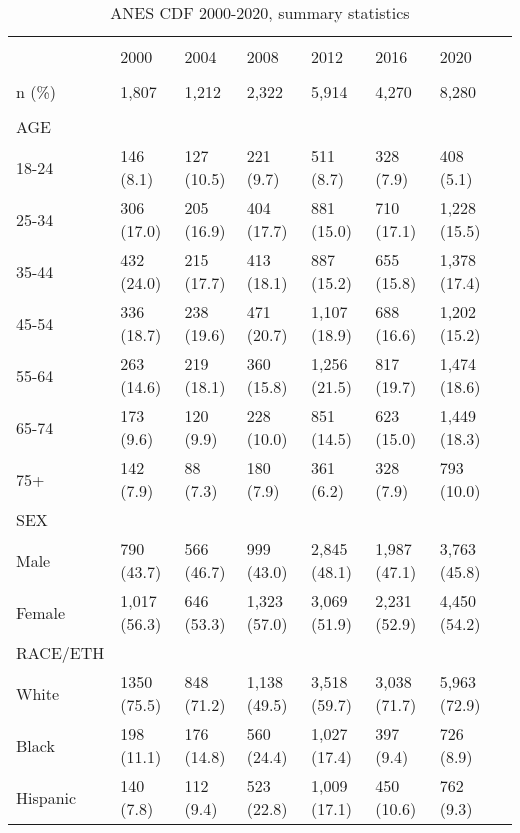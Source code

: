 \newpage
\begin{table}
\small
\centering
\begin{threeparttable}
\caption{ANES CDF 2000-2020, summary statistics} 
\label{tab:anestable1}
\begin{tabular}{llllllll}
  \hline \\ \vspace{0.45em}
  & 2000 & 2004 & 2008 & 2012 & 2016 & 2020 \\ 
  \hline \\ 
   n (\%) & 1,807 & 1,212 & 2,322 & 5,914 & 4,270 & 8,280 \\ 
       & &  & & & & &\\ 

    AGE& &  & & & & &\\ 
    18-24 & 146 (8.1) & 127 (10.5) & 221 (9.7) & 511 (8.7) & 328 (7.9) & 408 (5.1) \\ 
    25-34 & 306 (17.0) & 205 (16.9) & 404 (17.7) & 881 (15.0) & 710 (17.1) & 1,228 (15.5) \\ 
    35-44 & 432 (24.0) & 215 (17.7) & 413 (18.1) & 887 (15.2) & 655 (15.8) & 1,378 (17.4) \\ 
    45-54 & 336 (18.7) & 238 (19.6) & 471 (20.7) & 1,107 (18.9) & 688 (16.6) & 1,202 (15.2) \\ 
    55-64 & 263 (14.6) & 219 (18.1) & 360 (15.8) & 1,256 (21.5) & 817 (19.7) & 1,474 (18.6) \\ 
    65-74 & 173 (9.6) & 120 (9.9) & 228 (10.0) & 851 (14.5) & 623 (15.0) & 1,449 (18.3) \\ 
    75+ & 142 (7.9) & 88 (7.3) & 180 (7.9) & 361 (6.2) & 328 (7.9) & 793 (10.0)\vspace{0.5em} \\ 
    SEX& &  & & & & &\\
    Male & 790 (43.7) & 566 (46.7) & 999 (43.0) & 2,845 (48.1) & 1,987 (47.1) & 3,763 (45.8) \\ 
    Female & 1,017 (56.3) & 646 (53.3) & 1,323 (57.0) & 3,069 (51.9) & 2,231 (52.9) & 4,450 (54.2) \vspace{0.55em}\\ 
  RACE/ETH    & &  & & & & &\\ 
 White & 1350 (75.5) & 848 (71.2) & 1,138 (49.5) & 3,518 (59.7) & 3,038 (71.7) & 5,963 (72.9) \\ 
    Black & 198 (11.1) & 176 (14.8) & 560 (24.4) & 1,027 (17.4) & 397 (9.4) & 726 (8.9) \\ 
    Hispanic & 140 (7.8) & 112 (9.4) & 523 (22.8) & 1,009 (17.1) & 450 (10.6) & 762 (9.3) \\ 

\end{tabular}
\end{threeparttable}
\end{table}
